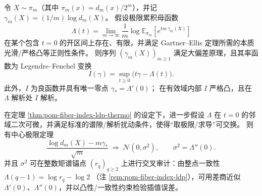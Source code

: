 \begin{theorem}\label{thm:pom-fiber-index-ldp-thermo}
令 \(X\sim\pi_m\)（其中 \(\pi_m(x)=d_m(x)/2^m\)），并记
\(
\gamma_m(X)=(1/m)\log d_m(X)
\)。
假设极限累积母函数
\[
\Lambda(t)=\lim_{m\to\infty}\frac{1}{m}\log \mathbb{E}_{\pi_m}\!\left[e^{t m\,\gamma_m(X)}\right]
\]
在某个包含 \(t=0\) 的开区间上存在、有限，并满足 Gartner--Ellis 定理所需的本质光滑/严格凸等正则性条件。
则序列 \((\gamma_m(X))_{m\ge 1}\) 满足大偏差原理，且其率函数为 Legendre--Fenchel 变换
\[
I(\gamma)=\sup_{t\ge 0}\bigl(t\gamma-\Lambda(t)\bigr).
\]
此外，\(I\) 为良函数并具有唯一零点
\(
\gamma_\ast=\Lambda'(0)
\)；
在有效域内部 \(I\) 严格凸，且在 \(\Lambda\) 解析处 \(I\) 解析。
\end{theorem}

\begin{theorem}[中心极限定理与二阶常数的可审计性]\label{thm:pom-fiber-index-clt-thermo}
在定理 \ref{thm:pom-fiber-index-ldp-thermo} 的设定下，进一步假设 \(\Lambda\) 在 \(t=0\) 的邻域二次可微，并满足标准的谱隙/解析扰动条件，使得“取极限/求导”可交换。
则有中心极限定理
\[
\frac{\log d_m(X)-m\gamma_\ast}{\sqrt m}\ \Longrightarrow\ \mathcal N(0,\sigma^2),
\qquad
\sigma^2=\Lambda''(0).
\]
并且 \(\sigma^2\) 可在整数矩谱锚点 \((r_q)_{q\ge 2}\) 上进行交叉审计：由整点一致性
\(
\Lambda(q-1)=\log r_q-\log 2
\)
（注 \ref{rem:pom-fiber-index-ldp}），可用差商近似 \(\Lambda'(0)\)、\(\Lambda''(0)\)，并以凸性/一致性约束检验插值误差。
\end{theorem}

